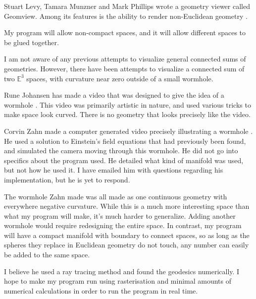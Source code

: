 \documentclass[12pt]{amsart}
\begin{document}
Stuart Levy, Tamara Munzner and Mark Phillips wrote a geometry viewer called Geomview. Among its features is the ability to render non-Euclidean geometry \cite{Geomview}.

My program will allow non-compact spaces, and it will allow different spaces to be glued together.



I am not aware of any previous attempts to visualize general connected sums of geometries. However, there have been attempts to visualize a connected sum of two $\mathbb{E}^3$ spaces, with curvature near zero outside of a small wormhole.

Rune Johansen has made a video that was designed to give the idea of a wormhole \cite{runevision}. This video was primarily artistic in nature, and used various tricks to make space look curved. There is no geometry that looks precisely like the video.

Corvin Zahn made a computer generated video precisely illustrating a wormhole \cite{spacetimetravel}. He used a solution to Einstein's field equations that had previously been found, and simulated the camera moving through this wormhole. He did not go into specifics about the program used. He detailed what kind of manifold was used, but not how he used it. I have emailed him with questions regarding his implementation, but he is yet to respond.

The wormhole Zahn made was all made as one continuous geometry with everywhere negative curvature. While this is a much more interesting space than what my program will make, it's much harder to generalize. Adding another wormhole would require redesigning the entire space. In contrast, my program will have a compact manifold with boundary to connect spaces, so as long as the spheres they replace in Euclidean geometry do not touch, any number can easily be added to the same space.

I believe he used a ray tracing method and found the geodesics numerically. I hope to make my program run using rasterisation and minimal amounts of numerical calculations in order to run the program in real time.







\end{document}
